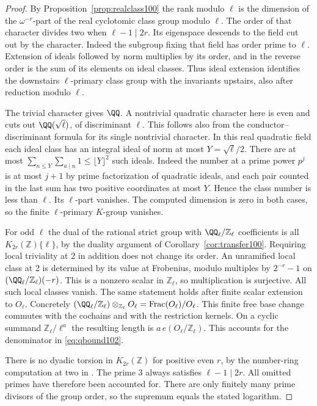 \documentclass[a4paper,11pt]{article}
\theoremstyle{definition}
\theoremstyle{remark}
\newcommand{\ZZ}{\mathbb Z}\newcommand{\ord}{\operatorname{ord}}
\numberwithin{equation}{section}
\begin{document}
\begin{proof}
By Proposition~\ref{prop:realclass100} the rank modulo \(\ell\)
is the dimension of the \(\omega^{-r}\)-part of the real
cyclotomic class group modulo \(\ell\). The order of that
character divides two when \(\ell-1\mid2r\).
Its eigenspace descends to the field cut out by the character.
Indeed the subgroup fixing that field has order prime to \(\ell\).
Extension of ideals followed by norm multiplies by its order,
and in the reverse order is the sum of its elements on ideal
classes. Thus ideal extension identifies the downstairs
\(\ell\)-primary class group with the invariants upstairs, also
after reduction modulo \(\ell\).

The trivial character gives \(\QQ\). A nontrivial quadratic
character here is even and cuts out \(\QQ(\sqrt{\ell})\), of
discriminant \(\ell\). This follows also from the
conductor--discriminant formula for its single nontrivial
character. In this real quadratic field each ideal class has
an integral ideal of norm at most \(Y=\sqrt{\ell}/2\).
There are at most \(\sum_{n\le Y}\sum_{a\mid n}1\le\lfloor
Y\rfloor^2\) such ideals. Indeed the number at a prime power
\(p^j\) is at most \(j+1\) by prime factorization of quadratic
ideals, and each pair counted in the last sum has two positive
coordinates at most \(Y\). Hence the class number is less than
\(\ell\). Its \(\ell\)-part vanishes. The computed dimension is
zero in both cases, so the finite \(\ell\)-primary \(K\)-group
vanishes.

For odd \(\ell\) the dual of the rational strict group with
\(\QQ_\ell/\ZZ_\ell\) coefficients is all
\(K_{2r}(\ZZ)\{\ell\}\), by the duality argument of
Corollary~\ref{cor:transfer100}. Requiring local triviality at
2 in addition does not change its order. An unramified local
class at 2 is determined by its value at Frobenius, modulo
multiples by \(2^{-r}-1\) on \((\QQ_\ell/\ZZ_\ell)(-r)\).
This is a nonzero scalar in \(\ZZ_\ell\), so multiplication
is surjective. All such local classes vanish. The same statement
holds after finite scalar extension to \(O_\ell\). Concretely
\((\QQ_\ell/\ZZ_\ell)\otimes_{\ZZ_\ell}O_\ell
=\operatorname{Frac}(O_\ell)/O_\ell\). This finite free base
change commutes with the cochains and with the restriction
kernels. On a cyclic summand \(\ZZ_\ell/\ell^a\) the resulting
length is \(a\,e(O_\ell/\ZZ_\ell)\). This accounts for the
denominator in \eqref{eq:qbound102}.

There is no dyadic torsion in \(K_{2r}(\ZZ)\) for positive even
\(r\), by the number-ring computation at two in
\cite[Ch.~VI, Cor.~9.8]{IV-II-I-weibel102}. The prime 3 always satisfies
\(\ell-1\mid2r\). All omitted primes have therefore been
accounted for. There are only finitely many prime divisors of
the group order, so the supremum equals the stated logarithm.
\end{proof}
\end{document}
